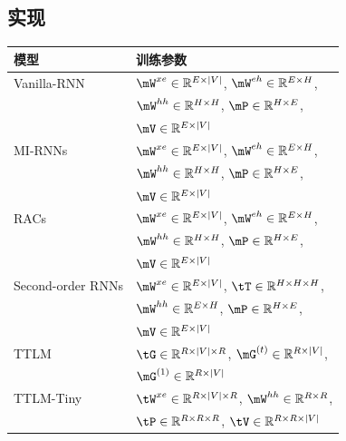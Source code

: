 \subsection{实现}
\label{sec:implementations}


\begin{table}[ht] \small
    \centering
    \begin{tabular}{ll}
    \toprule
        模型 & 训练参数 \\
        \midrule
        Vanilla-RNN & $\mW^{xe}\in \mathbb{R}^{E\times |V|}$, $\mW^{eh}\in \mathbb{R}^{E\times H}$, \\
        & $\mW^{hh}\in \mathbb{R}^{H\times H}$, $\mP\in\mathbb{R}^{H\times E}$, \\
        & $\mV\in\mathbb{R}^{E\times|V|}$  \\
        \hline
        MI-RNNs & $\mW^{xe}\in \mathbb{R}^{E\times |V|}$, $\mW^{eh}\in \mathbb{R}^{E\times H}$, \\
        & $\mW^{hh}\in \mathbb{R}^{H\times H}$, $\mP\in\mathbb{R}^{H\times E}$, \\
        & $\mV\in\mathbb{R}^{E\times|V|}$  \\

        \hline
        RACs & $\mW^{xe}\in \mathbb{R}^{E\times |V|}$, $\mW^{eh}\in \mathbb{R}^{E\times H}$, \\
        & $\mW^{hh}\in \mathbb{R}^{H\times H}$, $\mP\in\mathbb{R}^{H\times E}$, \\
        & $\mV\in\mathbb{R}^{E\times|V|}$\\
        \hline
        Second-order RNNs & $\mW^{xe} \in \mathbb{R}^{E\times |V|}$, $\tT \in \mathbb{R}^{H\times H \times H}$, \\
        & $\mW^{hh}\in \mathbb{R}^{E \times H}$, $\mP\in\mathbb{R}^{H\times E}$, \\
        & $\mV\in\mathbb{R}^{E\times|V|}$ \\
        \hline
        TTLM & $\tG\in \mathbb{R}^{R\times |V|\times R}$, $\mG^{(t)}\in \mathbb{R}^{R \times |V|}$, \\

        & $\mG^{(1)} \in \mathbb{R}^{R \times |V|}$ \\
        \hline
        TTLM-Tiny & $\tW^{xe}\in \mathbb{R}^{R\times |V| \times R}$, $\mW^{hh}\in\mathbb{R}^{R\times R}$, \\
        & $\tP\in\mathbb{R}^{R\times R\times R}$, $\tV\in\mathbb{R}^{R\times R\times |V|}$\\


\end{tabular}
\end{table}
